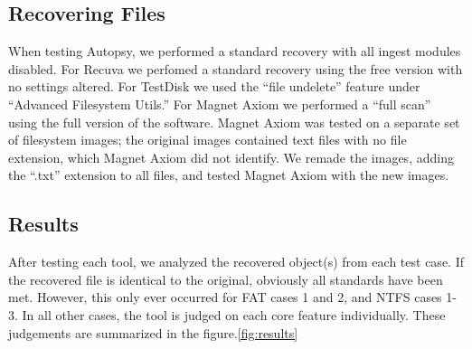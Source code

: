 
\subsection{Recovering Files}

When testing Autopsy, we performed a standard recovery with all ingest modules disabled.
For Recuva we perfomed a standard recovery using the free version with no settings altered.
For TestDisk we used the ``file undelete'' feature under ``Advanced Filesystem Utils.''
For Magnet Axiom we performed a ``full scan'' using the full version of the software. Magnet Axiom was tested on a separate set of filesystem images; the original images contained text files with no file extension, which Magnet Axiom did not identify. We remade the images, adding the ``.txt'' extension to all files, and tested Magnet Axiom with the new images.

\subsection{Results}

After testing each tool, we analyzed the recovered object(s) from each test case. If the recovered file is identical to the original, obviously all standards have been met. However, this only ever occurred for FAT cases 1 and 2, and NTFS cases 1-3. In all other cases, the tool is judged on each core feature individually. These judgements are summarized in the figure.\ref{fig:results}

